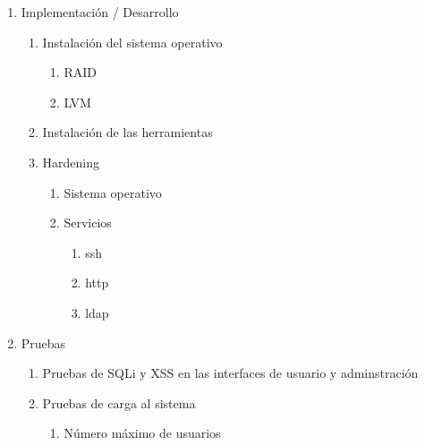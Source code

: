 {\begin{enumerate}
\begin{enumerate}
\begin{enumerate}
\begin{enumerate}
        \item SFTP
      \end{enumerate}
      \item Interfaz de administraci\'{o}n
        \begin{enumerate}
          \item Rails
        \end{enumerate}
    \end{enumerate}
    \item Especificaci\'{o}n del appliance
    \begin{enumerate}
      \item Hardware recomendado
      \item Versiones de software
      \item L\'{i}mites
    \end{enumerate}
  \end{enumerate}
  \item Implementaci\'{o}n / Desarrollo
  \begin{enumerate}
    \item Instalaci\'{o}n del sistema operativo
    \begin{enumerate}
      \item RAID
      \item LVM
    \end{enumerate}
    \item Instalaci\'{o}n de las herramientas
    \item Hardening
    \begin{enumerate}
      \item Sistema operativo
      \item Servicios
      \begin{enumerate}
        \item ssh
        \item http
        \item ldap
      \end{enumerate}
    \end{enumerate}
  \end{enumerate}
  \item Pruebas
  \begin{enumerate}
    \item Pruebas de SQLi y XSS en las interfaces de usuario y adminstraci\'{o}n
    \item Pruebas de carga al sistema
    \begin{enumerate}
      \item N\'{u}mero m\'{a}ximo de usuarios

\end{enumerate}
\end{enumerate}
\end{enumerate}}
